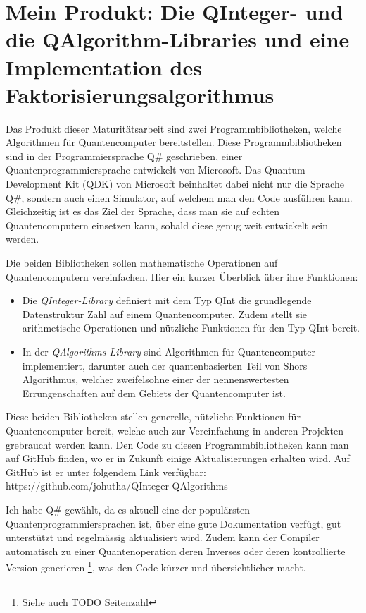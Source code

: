 \section{Mein Produkt: Die QInteger- und die QAlgorithm-Libraries und eine Implementation des Faktorisierungsalgorithmus}
Das Produkt dieser Maturitätsarbeit sind zwei Programmbibliotheken, welche Algorithmen für Quantencomputer bereitstellen. Diese Programmbibliotheken sind in der Programmiersprache Q\# geschrieben, einer Quantenprogrammiersprache entwickelt von Microsoft. Das Quantum Development Kit (QDK) von Microsoft beinhaltet dabei nicht nur die Sprache Q\#, sondern auch einen Simulator, auf welchem man den Code ausführen kann. Gleichzeitig ist es das Ziel der Sprache, dass man sie auf echten Quantencomputern einsetzen kann, sobald diese genug weit entwickelt sein werden.

Die beiden Bibliotheken sollen mathematische Operationen auf Quantencomputern vereinfachen. Hier ein kurzer Überblick über ihre Funktionen: %
\begin{itemize}
  \item Die \textit{QInteger-Library} definiert mit dem Typ \grqq QInt\grqq{} die grundlegende Datenstruktur \grqq Zahl\grqq{} auf einem Quantencomputer. Zudem stellt sie arithmetische Operationen und nützliche Funktionen für den Typ \grqq QInt\grqq{} bereit. %
  \item In der \textit{QAlgorithms-Library} sind Algorithmen für Quantencomputer implementiert, darunter auch der quantenbasierten Teil von Shors Algorithmus, welcher zweifelsohne einer der nennenswertesten Errungenschaften auf dem Gebiets der Quantencomputer ist.
\end{itemize}
Diese beiden Bibliotheken stellen generelle, nützliche Funktionen für Quantencomputer bereit, welche auch zur Vereinfachung in anderen Projekten grebraucht werden kann. Den Code zu diesen Programmbibliotheken kann man auf GitHub finden, wo er in Zukunft einige Aktualisierungen erhalten wird. Auf GitHub ist er unter folgendem Link verfügbar: https://github.com/johutha/QInteger-QAlgorithms

Ich habe Q\# gewählt, da es aktuell eine der populärsten Quantenprogrammiersprachen ist, über eine gute Dokumentation verfügt, gut unterstützt und regelmässig aktualisiert wird. Zudem kann der Compiler automatisch zu einer Quantenoperation deren Inverses oder deren kontrollierte Version generieren \footnote{Siehe auch TODO Seitenzahl}, was den Code kürzer und übersichtlicher macht.

